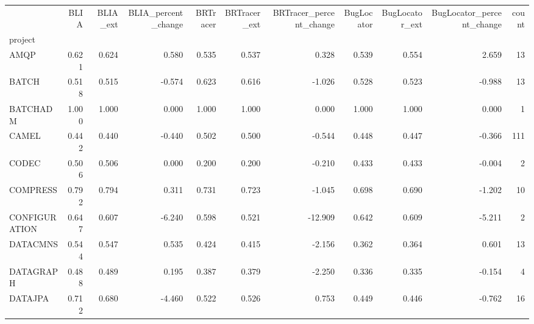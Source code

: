 \begin{tabular}{lrrrrrrrrrr}
\toprule
{} &  BLIA &  BLIA\_ext &  BLIA\_percent\_change &  BRTracer &  BRTracer\_ext &  BRTracer\_percent\_change &  BugLocator &  BugLocator\_ext &  BugLocator\_percent\_change &  count \\
project       &       &           &                      &           &               &                          &             &                 &                            &        \\
\midrule
AMQP          & 0.621 &     0.624 &                0.580 &     0.535 &         0.537 &                    0.328 &       0.539 &           0.554 &                      2.659 &     13 \\
BATCH         & 0.518 &     0.515 &               -0.574 &     0.623 &         0.616 &                   -1.026 &       0.528 &           0.523 &                     -0.988 &     13 \\
BATCHADM      & 1.000 &     1.000 &                0.000 &     1.000 &         1.000 &                    0.000 &       1.000 &           1.000 &                      0.000 &      1 \\
CAMEL         & 0.442 &     0.440 &               -0.440 &     0.502 &         0.500 &                   -0.544 &       0.448 &           0.447 &                     -0.366 &    111 \\
CODEC         & 0.506 &     0.506 &                0.000 &     0.200 &         0.200 &                   -0.210 &       0.433 &           0.433 &                     -0.004 &      2 \\
COMPRESS      & 0.792 &     0.794 &                0.311 &     0.731 &         0.723 &                   -1.045 &       0.698 &           0.690 &                     -1.202 &     10 \\
CONFIGURATION & 0.647 &     0.607 &               -6.240 &     0.598 &         0.521 &                  -12.909 &       0.642 &           0.609 &                     -5.211 &      2 \\
DATACMNS      & 0.544 &     0.547 &                0.535 &     0.424 &         0.415 &                   -2.156 &       0.362 &           0.364 &                      0.601 &     13 \\
DATAGRAPH     & 0.488 &     0.489 &                0.195 &     0.387 &         0.379 &                   -2.250 &       0.336 &           0.335 &                     -0.154 &      4 \\
DATAJPA       & 0.712 &     0.680 &               -4.460 &     0.522 &         0.526 &                    0.753 &       0.449 &           0.446 &                     -0.762 &     16 \\

\end{tabular}
